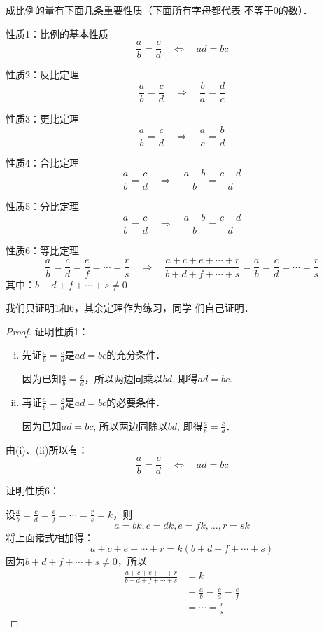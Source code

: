 成比例的量有下面几条重要性质（下面所有字母都代表
不等于0的数）．

\begin{blk}{性质1：比例的基本性质}
\[\frac{a}{b}=\frac{c}{d}\quad \Leftrightarrow\quad ad=bc\]
\end{blk}

\begin{blk}{性质2：反比定理}
    \[\frac{a}{b}=\frac{c}{d}\quad \Rightarrow\quad \frac{b}{a}=\frac{d}{c}\]       
\end{blk}

\begin{blk}{性质3：更比定理}
    \[\frac{a}{b}=\frac{c}{d}\quad \Rightarrow\quad \frac{a}{c}=\frac{b}{d}\] 
\end{blk}

\begin{blk}{性质4：合比定理}
    \[\frac{a}{b}=\frac{c}{d}\quad \Rightarrow\quad \frac{a+b}{b}=\frac{c+d}{d}\] 
\end{blk}

\begin{blk}{性质5：分比定理}
    \[\frac{a}{b}=\frac{c}{d}\quad \Rightarrow\quad \frac{a-b}{b}=\frac{c-d}{d}\] 
\end{blk}

\begin{blk}{性质6：等比定理}
    \[\frac{a}{b}=\frac{c}{d}=\frac{e}{f}=\cdots=\frac{r}{s}\quad \Rightarrow\quad \frac{a+c+e+\cdots+r}{b+d+f+\cdots+s}=\frac{a}{b}=\frac{c}{d}=\cdots=\frac{r}{s}\] 
其中：$b+d+f+\cdots+s\ne 0$
\end{blk}

我们只证明1和6，其余定理作为练习，同学
们自己证明．

\begin{proof}
证明性质1：
\begin{enumerate}[(i)]
    \item 先证$\frac{a}{b}=\frac{c}{d}$是$ad=bc$的充分条件．

    因为已知$\frac{a}{b}=\frac{c}{d}$，所以两边同乘以$bd$, 即得$ad=bc$.
\item     再证$\frac{a}{b}=\frac{c}{d}$是$ad=bc$的必要条件．

因为已知$ad=bc$, 所以两边同除以$bd$, 即得$\frac{a}{b}=\frac{c}{d}$．
\end{enumerate}

由(i)、(ii)所以有：
\[\frac{a}{b}=\frac{c}{d}\quad \Leftrightarrow\quad ad=bc\]

证明性质6：

设$\frac{a}{b}=\frac{c}{d}=\frac{e}{f}=\cdots=\frac{r}{s}=k$，则
\[a=bk, c=dk, e=fk, \ldots, r=sk\] 
将上面诸式相加得：
\[a+c+e+\cdots+r=k(b+d+f+\cdots+s)\]
因为$b+d+f+\cdots+s\ne 0$，所以
\[\begin{split}
    \frac{a+c+e+\cdots+r}{b+d+f+\cdots+s}&=k\\
    &=\frac{a}{b}=\frac{c}{d}=\frac{e}{f}\\
    &=\cdots=\frac{r}{s}
\end{split}
    \]
\end{proof}


